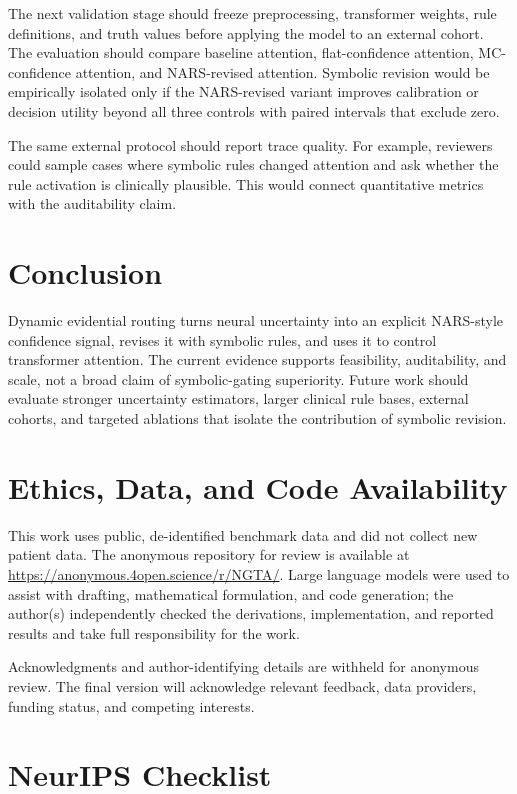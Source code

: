 \documentclass{article}
\begin{document}
The next validation stage should freeze preprocessing, transformer weights, rule definitions, and truth values before applying the model to an external cohort. The evaluation should compare baseline attention, flat-confidence attention, MC-confidence attention, and NARS-revised attention. Symbolic revision would be empirically isolated only if the NARS-revised variant improves calibration or decision utility beyond all three controls with paired intervals that exclude zero.

The same external protocol should report trace quality. For example, reviewers could sample cases where symbolic rules changed attention and ask whether the rule activation is clinically plausible. This would connect quantitative metrics with the auditability claim.

\section{Conclusion}
\label{sec:conclusion}

Dynamic evidential routing turns neural uncertainty into an explicit NARS-style confidence signal, revises it with symbolic rules, and uses it to control transformer attention. The current evidence supports feasibility, auditability, and scale, not a broad claim of symbolic-gating superiority. Future work should evaluate stronger uncertainty estimators, larger clinical rule bases, external cohorts, and targeted ablations that isolate the contribution of symbolic revision.

\section*{Ethics, Data, and Code Availability}

This work uses public, de-identified benchmark data and did not collect new patient data. The anonymous repository for review is available at \url{https://anonymous.4open.science/r/NGTA/}. Large language models were used to assist with drafting, mathematical formulation, and code generation; the author(s) independently checked the derivations, implementation, and reported results and take full responsibility for the work.

\begin{ack}
Acknowledgments and author-identifying details are withheld for anonymous review. The final version will acknowledge relevant feedback, data providers, funding status, and competing interests.
\end{ack}

{\small


}

\appendix

\section{NeurIPS Checklist}
\label{app:checklist}


\end{document}
